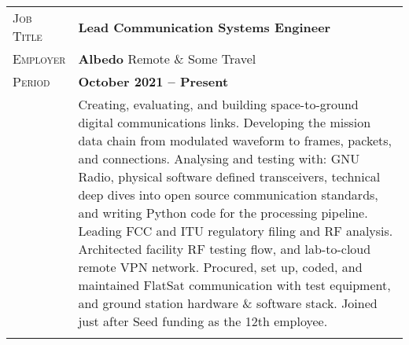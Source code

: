 \documentclass[a4paper, oneside, final]{scrartcl}
\newcommand{\gray}{\rowcolor[gray]{.90}} %
\begin{document}
\begin{center}
\begin{tabularx}{0.97\linewidth}{>{\raggedleft\scshape}p{2cm}X}
\gray Job Title & \textbf{Lead Communication Systems Engineer}\\
\gray Employer & \textbf{Albedo} \hfill Remote \& Some Travel\\
\gray Period & \textbf{October 2021 -- Present}\\
&
\vspace{-0.15 cm}
Creating, evaluating, and building space-to-ground digital communications links. Developing the mission data chain from modulated waveform to frames, packets, and connections. Analysing and testing with: GNU Radio, physical software defined transceivers, technical deep dives into open source communication standards, and writing Python code for the processing pipeline.
\newline
\newline
Leading FCC and ITU regulatory filing and RF analysis.
\newline
\newline
Architected facility RF testing flow, and lab-to-cloud remote VPN network. Procured, set up, coded, and maintained FlatSat communication with test equipment, and ground station hardware \& software stack.
\newline
\newline
Joined just after Seed funding as the 12th employee.
\\
\\
\end{tabularx}


\end{center}
\end{document}
